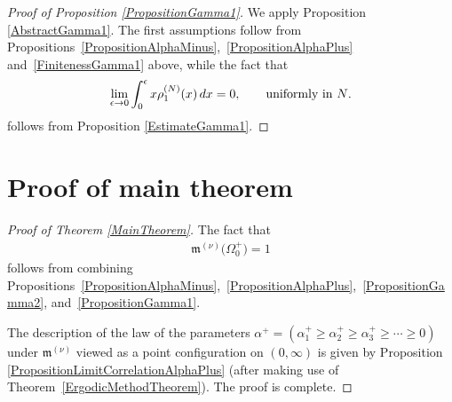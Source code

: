 \documentclass[11pt]{article}
\numberwithin{equation}{section}
\begin{document}
\begin{proof}[Proof of Proposition \ref{PropositionGamma1}] We apply Proposition \ref{AbstractGamma1}. The first assumptions follow from Pro\-po\-si\-tions~\ref{PropositionAlphaMinus},~\ref{PropositionAlphaPlus} and~\ref{FinitenessGamma1} above, while the fact that
\begin{gather*}
\lim_{\epsilon \to 0} \int_{0}^{\epsilon}x \rho_1^{(N)}(x)\,{\rm d}x=0, \qquad \text{uniformly in $N$}.
\end{gather*}
follows from Proposition \ref{EstimateGamma1}.
\end{proof}
\section{Proof of main theorem}\label{section8}

\begin{proof}[Proof of Theorem \ref{MainTheorem}]
The fact that
\begin{gather*}
\mathfrak{m}^{(\nu)}\big(\Omega_0^+\big)=1
\end{gather*}
follows from combining Propositions~\ref{PropositionAlphaMinus},~\ref{PropositionAlphaPlus},~\ref{PropositionGamma2}, and~\ref{PropositionGamma1}.

The description of the law of the parameters $\alpha^+=\left(\alpha^+_1\ge \alpha_2^+\ge\alpha_3^+\ge \cdots \ge 0\right)$ under $\mathfrak{m}^{(\nu)}$ viewed as a point configuration on $(0,\infty)$ is given by Proposition \ref{PropositionLimitCorrelationAlphaPlus} (after making use of Theorem~\ref{ErgodicMethodTheorem}). The proof is complete.
\end{proof}
\end{document}
